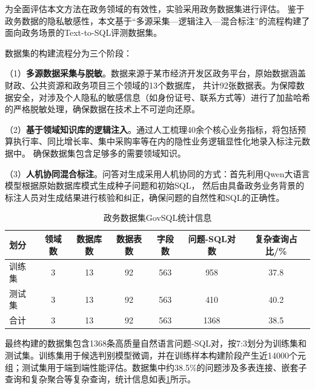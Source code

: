 为全面评估本文方法在政务领域的有效性，实验采用政务数据集进行评估。
鉴于政务数据的隐私敏感性，本文基于“多源采集—逻辑注入—混合标注”的流程构建了面向政务场景的Text-to-SQL评测数据集。

数据集的构建流程分为三个阶段：

（1）\textbf{多源数据采集与脱敏}。数据来源于某市经济开发区政务平台，原始数据涵盖财政、公共资源和政务项目三个领域的13个数据库，
共计92张数据表。为保障数据安全，对涉及个人隐私的敏感信息（如身份证号、联系方式等）进行了加盐哈希的严格脱敏处理，确保数据在技术上不可逆向还原。

（2）\textbf{基于领域知识库的逻辑注入}。通过人工梳理40余个核心业务指标，将包括预算执行率、同比增长率、集中采购率等在内的隐性业务逻辑显性化地录入标注元数据中。
确保数据集包含足够多的需要领域知识。

（3）\textbf{人机协同混合标注}。问答对生成采用人机协同的方式：首先利用Qwen大语言模型\cite{qwen32024}根据原始数据库模式生成种子问题和初始SQL，
然后由具备政务业务背景的标注人员对生成结果进行核验和纠正，确保问题的自然性和SQL的正确性。

\begin{table}[!htbp]
	\setlength{\abovecaptionskip}{5pt}
	\setlength{\belowcaptionskip}{5pt}
	\caption{政务数据集GovSQL统计信息}
	\label{tab:dataset_stats}
	\centering
	\begin{tabular}{lcccccc}
		\toprule
		划分 & 领域数 & 数据库数 & 数据表数 & 字段数 & 问题-SQL对数 & 复杂查询占比/\% \\
		\midrule
		训练集 & 3 & 13 & 92 & 563 & 958 & 37.8 \\
		测试集 & 3 & 13 & 92 & 563 & 410 & 40.2 \\
		\midrule
		合计 & 3 & 13 & 92 & 563 & 1368 & 38.5 \\
		\bottomrule
	\end{tabular}
\end{table}

最终构建的数据集包含1368条高质量自然语言问题-SQL对，按7:3划分为训练集和测试集。训练集用于候选判别模型微调，并在训练样本构建阶段产生近14000个元组；测试集用于端到端性能评估。数据集中约38.5\%的问题涉及多表连接、嵌套子查询和复杂聚合等复杂查询，统计信息如表\ref{tab:dataset_stats}所示。


